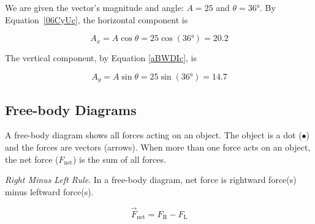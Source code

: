 \documentclass[main.tex]{subfiles}
\begin{document}
\Solution We are given the vector's magnitude and angle: $A = 25$ and $\theta=\ang{36}$. By Equation~\eqref{06CyUc}, the horizontal component is

\begin{equation*}
    A_x = A \cos{\theta} = 25 \cos{(\ang{36})} = 20.2
\end{equation*}

The vertical component, by Equation \eqref{aBWDIc}, is

\begin{equation*}
    A_y = A \sin{\theta} = 25 \sin{(\ang{36})} = 14.7
\end{equation*}

\endsolution

\subsection{Free-body Diagrams} \label{SdNOfY}

A \gls{free-body diagram} shows all forces acting on an object. The object is a dot ($\bullet$) and the forces are vectors (arrows). When more than one force acts on an object, the \gls{net force} ($F_{\text{net}}$) is the sum of all forces. 

\begin{mdframed}[backgroundcolor=black!10]
\textit{Right Minus Left Rule}. In a free-body diagram, net force is rightward force(s) minus leftward force(s).

\begin{center}
\end{center}
\vspace{-1em}

\begin{equation}
    \vec{F}_{\text{net}} = F_{\text{R}} - F_{\text{L}}
\end{equation}
\end{mdframed}
\end{document}
